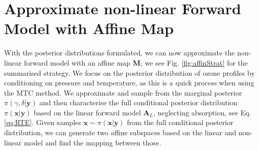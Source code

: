 %

\section{Approximate non-linear Forward Model with Affine Map} 
\label{sec:affineMap}
With the posterior distributions formulated, we can now approximate the non-linear forward model with an affine map $\bm{M}$; we see Fig. \ref{fig:affinStrat} for the summarised strategy.
We focus on the posterior distribution of ozone profiles by conditioning on pressure and temperature, as this is a quick process when using the MTC method.
We approximate and sample from the marginal posterior $ \pi(\gamma , \delta|\bm{y})$ and then characterise the full conditional posterior distribution $\pi(\bm{x}|\bm{y})$ based on the linear forward model $\bm{A}_L$, neglecting absorption, see Eq. \ref{eq:RTE}.
Given samples $\bm{x} \sim \pi(\bm{x}|\bm{y})$ from the full conditional posterior distribution, we can generate two affine subspaces based on the linear and non-linear model and find the mapping between those.

